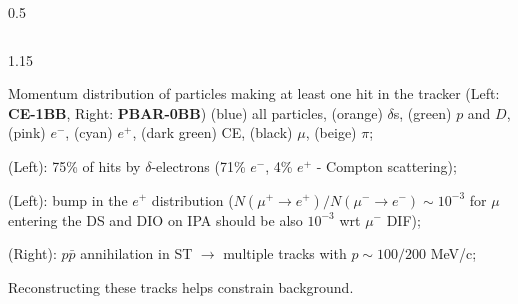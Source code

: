 \documentclass{beamer}
\begin{document}
\begin{frame}
\begin{columns}
\begin{column}{0.5\framewidth}
\begin{figure}[!h]
       \label{fig:momhits}
\end{figure}
        \end{column}
    \end{columns}
    \vspace{-5mm}
    \begin{columns}
        \begin{column}{1.15\framewidth}
    \setlength{\leftmargini}{1.2em}
    \begin{itemize}
    {\small
            \item Momentum distribution of particles making at least one hit in the tracker (Left: \textbf{CE-1BB}, Right: \textbf{PBAR-0BB})     {\footnotesize(blue) all particles, (orange) $\delta$s, (green) $p$ and $D$, (pink) $e^-$, (cyan) $e^+$, (dark green) CE, (black) $\mu$, (beige) $\pi$};
            \vspace{1mm}
            \item (Left): 75\% of hits by $\delta$-electrons (71\% $e^-$, 4\% $e^+$ - Compton scattering);
              \vspace{1mm}
            \item (Left): bump in the $e^+$ distribution ($N(\mu^+ \rightarrow e^+ )/N(\mu^- \rightarrow e^-) \sim 10^{-3}$ for $\mu$ entering the DS and DIO on IPA should be also $10^{-3}$ wrt $\mu^-$ DIF);
              \vspace{1mm}
            \item  (Right): $p\bar{p}$ annihilation in ST $\rightarrow$ multiple tracks with $p \sim 100/200$ MeV/c;
              \vspace{1mm}
            \item Reconstructing these tracks helps constrain background.
          
}
           \end{itemize} 
        \end{column}
      
    \end{columns}
\end{frame}
\end{document}
